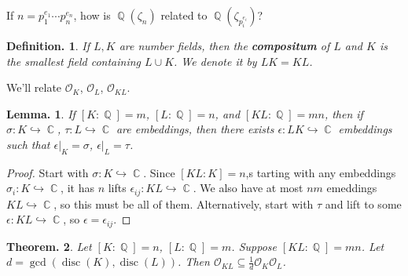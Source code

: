 \documentclass[11pt, a4paper]{memoir}
\DeclareMathOperator{\Q}{{\mathbb{Q}}}
\DeclareMathOperator{\C}{{\mathbb{C}}}
\theoremstyle{change}
\newtheorem{theorem}{Theorem.}[section]
\newtheorem{lemma}[theorem]{Lemma.}
\theoremstyle{plain}
\theoremstyle{nonumberplain}
\newtheorem{definition}{Definition.}
\newtheorem{proof}{Proof}
\DeclareMathOperator{\disc}{disc}
\begin{document}
If $n=p_1^{e_1}\cdots p_n^{e_n}$, how is $\Q(\zeta_n)$ related to $\Q(\zeta_{p_i^{e_i}})$?
\begin{definition}
    If $L,K$ are number fields, then the \textbf{compositum} of $L$ and $K$ is the smallest field containing $L\cup K$.
    We denote it by $LK=KL$.
\end{definition}
We'll relate $\mathcal{O}_K$, $\mathcal{O}_L$, $\mathcal{O}_{KL}$.
\begin{lemma}
    If $[K:\Q]=m$, $[L:\Q]=n$, and $[KL:\Q]=mn$, then if $\sigma:K\hookrightarrow\C$, $\tau:L\hookrightarrow\C$ are embeddings, then there exists $\epsilon:LK\hookrightarrow\C$ embeddings such that $\epsilon|_K=\sigma$, $\epsilon|_L=\tau$.
\end{lemma}
\begin{proof}
    Start with $\sigma:K\hookrightarrow\C$.
    Since $[KL:K]=n$,s tarting with any embeddings $\sigma_i:K\hookrightarrow\C$, it has $n$ lifts $\epsilon_{ij}:KL\hookrightarrow\C$.
    We also have at most $nm$ emeddings $KL\hookrightarrow\C$, so this must be all of them.
    Alternatively, start with $\tau$ and lift to some $\epsilon:KL\hookrightarrow\C$, so $\epsilon=\epsilon_{ij}$.
\end{proof}
\begin{theorem}
    Let $[K:\Q]=n$, $[L:\Q]=m$.
    Suppose $[KL:\Q]=mn$.
    Let $d=\gcd(\disc(K),\disc(L))$.
    Then $\mathcal{O}_{KL}\subseteq\frac{1}{d}\mathcal{O}_K\mathcal{O}_L$.
\end{theorem}
\end{document}
